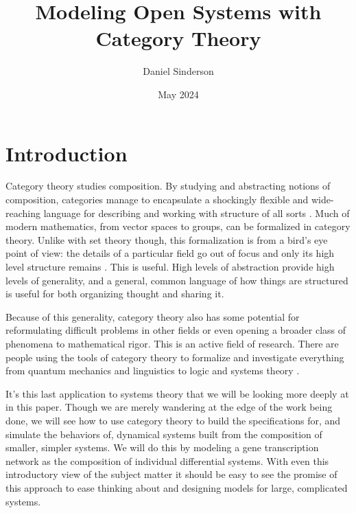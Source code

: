 \documentclass[12pt]{article}
\title{Modeling Open Systems with Category Theory}
\author{Daniel Sinderson}
\date{May 2024}
\begin{document}
\maketitle


\section*{Introduction}
Category theory studies composition.
By studying and abstracting notions of composition, categories manage to encapsulate
a shockingly flexible and wide-reaching language for describing and working with structure of all sorts \cite{fong2019invitation}.
Much of modern mathematics, from vector spaces to groups, can be formalized in category theory.
Unlike with set theory though, this formalization is from a bird's eye point of view:
the details of a particular field go out of focus and only its high level structure remains \cite{riehl2017category}.
This is useful.
High levels of abstraction provide high levels of generality,
and a general, common language of how things are structured is useful for both organizing thought and sharing it.

Because of this generality, category theory also has some potential for reformulating difficult problems in other fields or even opening a broader class of phenomena to mathematical rigor.
This is an active field of research.
There are people using the tools of category theory to formalize and investigate everything from quantum mechanics and linguistics to logic and systems theory \cite{asudeh2020enriched, Coecke_Kissinger_2017, ggoldblatt2014topoi, myers2022categorical}.

It's this last application to systems theory that we will be looking more deeply at in this paper.
Though we are merely wandering at the edge of the work being done, we will see how to use category theory to build the specifications for, and simulate the behaviors of, dynamical systems built from the composition of smaller, simpler systems.
We will do this by modeling a gene transcription network as the composition of individual differential systems.
With even this introductory view of the subject matter it should be easy to see the promise of this approach to ease thinking about and designing models for large, complicated systems.
\end{document}
